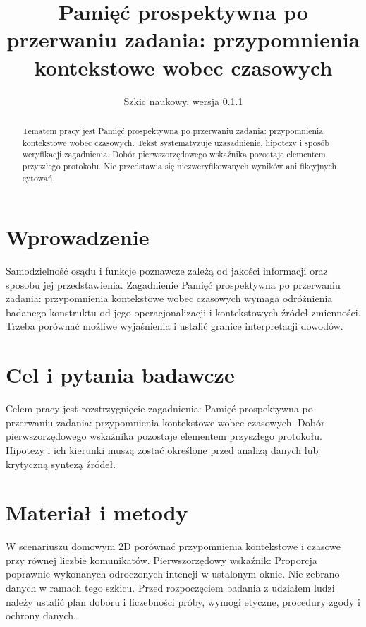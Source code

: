 \documentclass[11pt,a4paper]{article}
\title{Pamięć prospektywna po przerwaniu zadania: przypomnienia kontekstowe wobec czasowych}
\author{}
\date{Szkic naukowy, wersja 0.1.1}
\begin{document}
\maketitle

\begin{abstract}

Tematem pracy jest Pamięć prospektywna po przerwaniu zadania: przypomnienia kontekstowe wobec czasowych. Tekst systematyzuje uzasadnienie, hipotezy i sposób weryfikacji zagadnienia. Dobór pierwszorzędowego wskaźnika pozostaje elementem przyszłego protokołu. Nie przedstawia się niezweryfikowanych wyników ani fikcyjnych cytowań.

\end{abstract}

\section{Wprowadzenie}

Samodzielność osądu i funkcje poznawcze zależą od jakości informacji oraz sposobu jej przedstawienia. Zagadnienie Pamięć prospektywna po przerwaniu zadania: przypomnienia kontekstowe wobec czasowych wymaga odróżnienia badanego konstruktu od jego operacjonalizacji i kontekstowych źródeł zmienności. Trzeba porównać możliwe wyjaśnienia i ustalić granice interpretacji dowodów.

\section{Cel i pytania badawcze}

Celem pracy jest rozstrzygnięcie zagadnienia: Pamięć prospektywna po przerwaniu zadania: przypomnienia kontekstowe wobec czasowych. Dobór pierwszorzędowego wskaźnika pozostaje elementem przyszłego protokołu. Hipotezy i ich kierunki muszą zostać określone przed analizą danych lub krytyczną syntezą źródeł.

\section{Materiał i metody}

W scenariuszu domowym 2D porównać przypomnienia kontekstowe i czasowe przy równej liczbie komunikatów. Pierwszorzędowy wskaźnik: Proporcja poprawnie wykonanych odroczonych intencji w ustalonym oknie. Nie zebrano danych w ramach tego szkicu. Przed rozpoczęciem badania z udziałem ludzi należy ustalić plan doboru i liczebności próby, wymogi etyczne, procedury zgody i ochrony danych.
\end{document}
